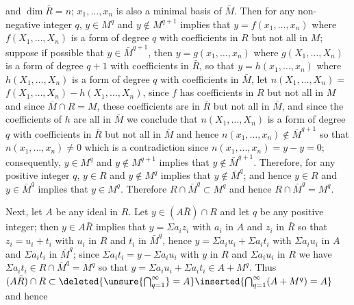 and $\dim\bar R=n$; $x_1,\ldots,x_n$ is also a minimal basis of $\bar M$. Then
for any non-negative integer $q$, $y\in M^q$ and $y\notin M^{q+1}$ implies
that $y=f(x_1,\ldots,x_n)$ where $f(X_1,\ldots,X_n)$ is a form of
degree $q$ with coefficients in $R$ but not all in $M$; suppose if
possible that $y\in\bar M^{q+1}$, then $y=g(x_1,\ldots,x_n)$ where
$g(X_1,\ldots,X_n)$ is a form of degree $q+1$ with coefficients in
$\bar R$, so that $y=h(x_1,\ldots,x_n)$ where $h(X_1,\ldots,X_n)$ is a form
of degree $q$ with coefficients in $\bar M$, let $n(X_1,\ldots,X_n)=$
$f(X_1,\ldots,X_n)-h(X_1,\ldots,X_n)$, since $f$ has coefficients in $R$
but not all in $M$ and since $\bar M\cap R=M$, these coefficients are
in $\bar R$ but not all in $\bar M$, and since the coefficients of $h$ are
all in $\bar M$ we conclude that $n(X_1,\ldots,X_n)$ is a form of degree
$q$ with coefficients in $\bar R$ but not all in $\bar M$ and hence
$n(x_1,\ldots,x_n)\notin\bar M^{q+1}$ so that $n(x_1,\ldots,x_n)\ne0$ which is a
contradiction since $n(x_1,\ldots,x_n)=y-y=0$; consequently,
$y\in M^q$ and $y\notin M^{q+1}$ implies that $y\notin\bar M^{q+1}$. Therefore, for
any positive integer $q$, $y\in R$ and $y\notin M^q$ implies that $y\notin\bar M^q$;
and hence $y\in R$ and $y\in\bar M^q$ implies that $y\in M^q$. Therefore
$R\cap\bar M^q\subset M^q$ and hence $R\cap\bar M^q=M^q$.

Next, let $A$ be any ideal in $R$. Let $y\in(A\bar R)\cap R$ and let
$q$ be any positive integer; then $y\in A\bar R$ implies that $y=\Sigma a_i z_i$
with $a_i$ in $A$ and $z_i$ in $\bar R$ so that $z_i=u_i+t_i$ with $u_i$
in $R$ and $t_i$ in $\bar M^q$, hence $y=\Sigma a_i u_i+\Sigma a_i t_i$ with $\Sigma a_i u_i$ in
$A$ and $\Sigma a_i t_i$ in $\bar M^q$; since $\Sigma a_i t_i=y-\Sigma a_i u_i$ with $y$ in $R$
and $\Sigma a_i u_i$ in $R$ we have $\Sigma a_i t_i\in R\cap\bar M^q=M^q$ so that
$y=\Sigma a_i u_i+\Sigma a_i t_i\in A+M^q$. Thus $(A\bar R)\cap R\subset\deleted{\unsure{\bigcap_{q=1}^{\infty}}=A}\inserted{\bigcap_{q=1}^{\infty}(A+M^q)=A}$ and hence
